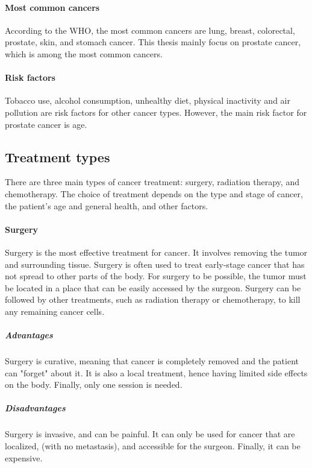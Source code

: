 \paragraph{Most common cancers}
According to the WHO, the most common cancers are lung, breast, colorectal, prostate, skin, and stomach cancer.
This thesis mainly focus on prostate cancer, which is among the most common cancers.

\paragraph{Risk factors}
Tobacco use, alcohol consumption, unhealthy diet, physical inactivity and air pollution are risk factors for other cancer types.
However, the main risk factor for prostate cancer is age.

\subsection{Treatment types}

There are three main types of cancer treatment: surgery, radiation therapy, and chemotherapy.
The choice of treatment depends on the type and stage of cancer, the patient's age and general health, and other factors.

\paragraph{Surgery}
Surgery is the most effective treatment for cancer.
It involves removing the tumor and surrounding tissue.
Surgery is often used to treat early-stage cancer that has not spread to other parts of the body.
For surgery to be possible, the tumor must be located in a place that can be easily accessed by the surgeon.
Surgery can be followed by other treatments, such as radiation therapy or chemotherapy, to kill any remaining cancer cells.

\subparagraph{Advantages}
Surgery is curative, meaning that cancer is completely removed and the patient can "forget" about it.
It is also a local treatment, hence having limited side effects on the body.
Finally, only one session is needed.

\subparagraph{Disadvantages}
Surgery is invasive, and can be painful.
It can only be used for cancer that are localized, (with no metastasis), and accessible for the surgeon.
Finally, it can be expensive.


